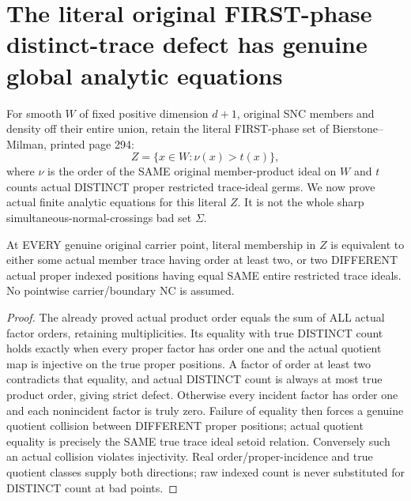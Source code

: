 \section{The literal original FIRST-phase distinct-trace defect has genuine global analytic equations}

For smooth $W$ of fixed positive dimension $d+1$, original SNC members and
density off their entire union, retain the literal FIRST-phase set of
Bierstone--Milman, printed page 294:
\[
 Z=\{x\in W:\nu(x)>t(x)\},
\]
where $\nu$ is the order of the SAME original member-product ideal on $W$ and
$t$ counts actual DISTINCT proper restricted trace-ideal germs. We now prove
actual finite analytic equations for this literal $Z$. It is not the whole
sharp simultaneous-normal-crossings bad set $\Sigma$.

\begin{theorem}
\label{hir:sharp-original-distinct-defect-actual-witness-dictionary}
\leanok
At EVERY genuine original carrier point, literal membership in $Z$ is
equivalent to either some actual member trace having order at least two,
or two DIFFERENT actual proper indexed positions having equal SAME entire
restricted trace ideals. No pointwise carrier/boundary NC is assumed.
\end{theorem}
\begin{proof}
The already proved actual product order equals the sum of ALL actual factor
orders, retaining multiplicities. Its equality with true DISTINCT count holds
exactly when every proper factor has order one and the actual quotient map
is injective on the true proper positions. A factor of order at least two
contradicts that equality, and actual DISTINCT count is always at most true
product order, giving strict defect. Otherwise every incident factor has
order one and each nonincident factor is truly zero. Failure of equality then
forces a genuine quotient collision between DIFFERENT proper positions;
actual quotient equality is precisely the SAME true trace ideal setoid
relation. Conversely such an actual collision violates injectivity. Real
order/proper-incidence and true quotient classes supply both directions;
raw indexed count is never substituted for DISTINCT count at bad points.
\end{proof}

